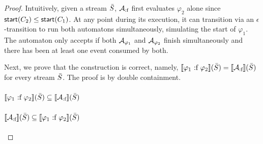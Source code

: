 \begin{proof}
	Intuitively, given a stream $\bar{S}$, $\mathcal{A}_{\text{:f}}$ first evaluates $\varphi_2$ alone since $\mathsf{start}(C_2) \leq \mathsf{start}(C_1)$. At any point during its execution, it can transition via an $\epsilon$-transition to run both automatons simultaneously, simulating the start of $\varphi_1$. The automaton only accepts if both $\mathcal{A}_{\varphi_1}$ and $\mathcal{A}_{\varphi_2}$ finish simultaneously and there has been at least one event consumed by both.
	
	Next, we prove that the construction is correct, namely, $\sem{\varphi_1 \finishes \varphi_2}(\Stream) = \sem{\cAfinishes}(\Stream)$ for every stream $\bar{S}$. The proof is by double containment.
	
	\paragraph{$\sem{\varphi_1 \finishes \varphi_2}(\Stream) \subseteq \sem{\cAfinishes}(\Stream)$}
	
	\paragraph{$\sem{\cAfinishes}(\Stream) \subseteq \sem{\varphi_1 \finishes \varphi_2}(\Stream)$}
\end{proof}